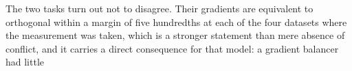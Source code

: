 The two tasks turn out not to disagree. Their gradients are equivalent to orthogonal within a margin of
five hundredths at each of the four datasets where the measurement was taken, which is a stronger statement than mere absence of
conflict, and it carries a direct consequence for that model: a gradient balancer had little
